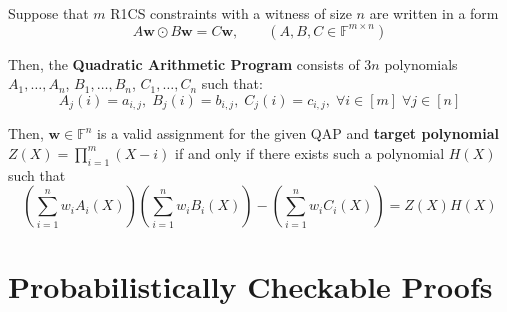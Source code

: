 \documentclass{zkdl-presentation-template}
\begin{document}
    \begin{frame}
        \begin{definition}
            Suppose that $m$ R1CS constraints with a witness of size $n$ are written in a form
            \begin{equation*}
                A\boldsymbol{w} \odot B\boldsymbol{w} = C\boldsymbol{w}, \qquad (A,B,C \in \mathbb{F}^{m \times n})
            \end{equation*}
        
            Then, the \textbf{Quadratic Arithmetic Program} consists of $3n$ polynomials $A_1,\dots,A_n$, $B_1,\dots,B_n$, $C_1,\dots,C_n$ such that:
            \begin{equation*}
                A_j(i) = a_{i,j}, \; B_j(i) = b_{i,j}, \; C_j(i) = c_{i,j}, \; \forall i \in [m] \; \forall j \in [n]
            \end{equation*}
        
            Then, $\boldsymbol{w} \in \mathbb{F}^n$ is a valid assignment for the given QAP and \textbf{target polynomial} $Z(X) = \prod_{i=1}^m (X-i)$ if and only if there exists such a polynomial $H(X)$ such that
            \begin{equation*}
                \left( \sum_{i = 1}^{n} w_iA_i(X) \right)\left( \sum_{i = 1}^{n} w_iB_i(X) \right) - \left( \sum_{i = 1}^{n} w_iC_i(X) \right) = Z(X)H(X)
            \end{equation*}
        \end{definition}
    \end{frame}

    \section{Probabilistically Checkable Proofs}
\end{document}
